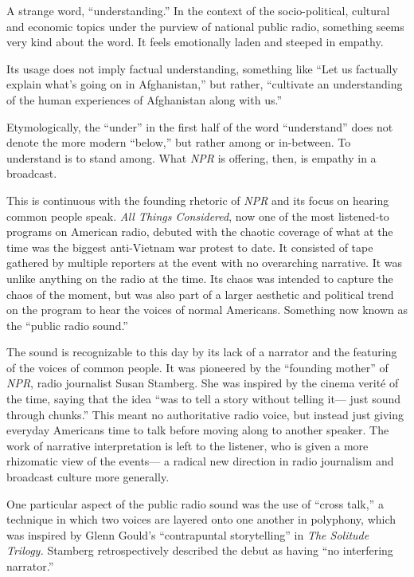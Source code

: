 \documentclass[12pt,letterpaper]{article}
\begin{document}
	A strange word, ``understanding.'' In the context of the 
	socio-political,
	cultural and economic topics under the purview of national public 
	radio, something seems very kind about the word. It feels emotionally
	laden and steeped in empathy. 

	Its usage does not imply factual understanding, something like ``Let
	us factually explain what's going on in Afghanistan,'' but rather, 
	``cultivate an understanding of the human experiences of Afghanistan 
	along with us.'' 


	Etymologically, the ``under'' in the first half of the word 
	``understand'' does not denote the more modern ``below,'' but rather 
	among or in-between. \autocite{Ety} To understand is to stand among. 
	What \textit{NPR} is offering, then, is empathy in a broadcast. 


	This is continuous with the founding rhetoric of \textit{NPR} and its
	focus on hearing common people speak. 
	\textit{All Things Considered}, now one of the most listened-to programs
	on American radio, debuted with the chaotic coverage of
	what at the time was the biggest anti-Vietnam war protest to date. It
	consisted of tape gathered by multiple reporters at the event with no 
	overarching narrative. It was unlike anything on the radio at the time.
	Its chaos was intended to capture the chaos of the moment, but was also
	part of a larger aesthetic and political trend on the program to hear 
	the voices of normal Americans. Something now known as the 
	``public radio sound.'' 

	The sound is recognizable to this day by its lack of a 
	narrator and the featuring of the voices of common people. It 
	was pioneered by the ``founding mother'' of \textit{NPR}, radio 
	journalist Susan Stamberg. She was inspired by the cinema verité of the
	time, saying that the idea ``was to tell a story without telling it---
	just sound through chunks.'' This meant no authoritative radio voice,
	but instead just giving everyday Americans time to talk before moving 
	along to another speaker. The work of narrative interpretation is left
	to the listener, who is given a more rhizomatic view of the events---
	a radical new direction in radio journalism and broadcast culture more
	generally.  

	One particular aspect of the public radio sound was the use of ``cross
	talk,'' a technique in which two voices are layered onto one another 	
	in polyphony, which was inspired by Glenn Gould's ``contrapuntal 
	storytelling'' in \textit{The Solitude Trilogy.}\autocite[197]{Porter}
	Stamberg retrospectively described the debut as having ``no interfering 
	narrator.''\autocite[185]{Porter}
\end{document}
